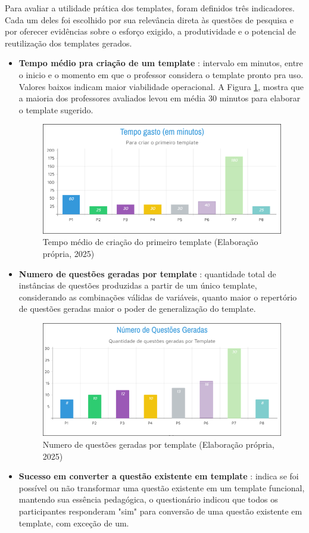Para avaliar a utilidade prática dos templates, foram definidos três indicadores. Cada um deles foi escolhido por sua relevância direta às questões de pesquisa e por oferecer evidências sobre o esforço exigido, a produtividade e o potencial de reutilização dos templates gerados.
    \begin{itemize}
        \item \textbf{Tempo médio pra criação de um template} : intervalo em minutos, entre o inicio e o momento em que o professor considera o template pronto pra uso. Valores baixos indicam maior viabilidade operacional. A Figura \ref{fig:tempo-gasto}, mostra que a maioria dos professores avaliados levou em média 30 minutos para elaborar o template sugerido.
\begin{figure}[ht]
	\centering
	\includegraphics[width=16cm]{./imagens/capitulo8/tempo-gasto}
	\caption{Tempo médio de criação do primeiro template (Elaboração própria, 2025) }
	\label{fig:tempo-gasto}
\end{figure}
        \item \textbf{Numero de questões geradas por template} : quantidade total de instâncias de questões produzidas a partir de um único template, considerando as combinações válidas de variáveis, quanto maior o repertório de questões geradas maior o poder de generalização do template.
\begin{figure}[ht]
	\centering
	\includegraphics[width=16cm]{./imagens/capitulo8/questoes-geradas}
	\caption{Numero de questões geradas por template (Elaboração própria, 2025) }
	\label{fig:questoes-geradas}
\end{figure}
        \item  \textbf{Sucesso em converter a questão existente em template }: indica se foi possível ou não transformar uma questão existente em um template funcional, mantendo sua essência pedagógica, o questionário indicou que todos os participantes responderam "sim" para conversão de uma questão existente em template, com exceção de um. 
    \end{itemize}


